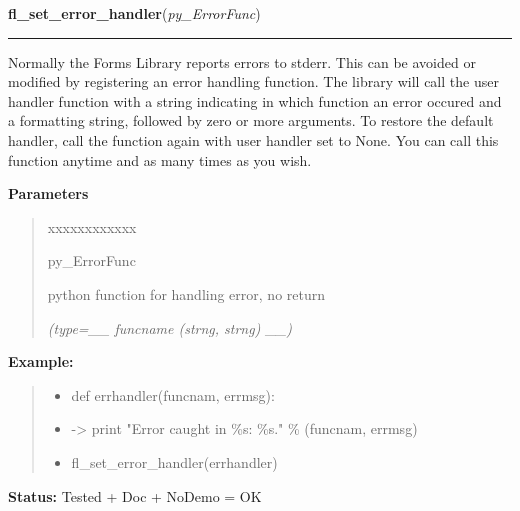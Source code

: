 \hspace{.8\funcindent}\begin{boxedminipage}{\funcwidth}

    \raggedright \textbf{fl\_set\_error\_handler}(\textit{py\_ErrorFunc})

    \vspace{-1.5ex}

    \rule{\textwidth}{0.5\fboxrule}
\setlength{\parskip}{2ex}
    Normally the Forms Library reports errors to stderr. This can be 
    avoided or modified by registering an error handling function. The 
    library will call the user handler function with a string indicating in
    which function an error occured and a formatting string, followed by 
    zero or more arguments. To restore the default handler, call the 
    function again with user handler set to None. You can call this 
    function anytime and as many times as you wish.

\setlength{\parskip}{1ex}
      \textbf{Parameters}
      \vspace{-1ex}

      \begin{quote}
        \begin{Ventry}{xxxxxxxxxxxx}

          \item[py\_ErrorFunc]

          python function for handling error, no return

            {\it (type=\_\_ funcname (strng, strng) \_\_)}

        \end{Ventry}

      \end{quote}

\textbf{Example:}
\begin{quote}
  \begin{itemize}

  \item
    \setlength{\parskip}{0.6ex}
def errhandler(funcnam, errmsg):



  \item {\textbar}-{\textgreater}{\textbar} print "Error caught in \%s: \%s." \% 
(funcnam, errmsg)



  \item fl\_set\_error\_handler(errhandler)



\end{itemize}

\end{quote}

\textbf{Status:} Tested + Doc + NoDemo = OK



    \end{boxedminipage}

